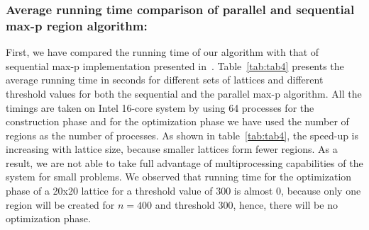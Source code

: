 \documentclass[conference]{IEEEtran}
\begin{document}
\subsubsection*{Average running time comparison of parallel and sequential max-p region algorithm:}
First, we have compared the running time of our algorithm with that of sequential max-p
implementation presented in~\cite{r1}. Table~\ref{tab:tab4} presents the average
running time in seconds for different sets of lattices and different threshold
values for both the sequential and the parallel max-p algorithm. All the timings are taken on Intel 16-core system by using 64 processes for the construction phase and for the optimization phase we have used the number of regions as the number of processes. As shown in table~\ref{tab:tab4}, the speed-up is increasing with lattice size, because smaller lattices form fewer regions. As a result, we are not able to take full advantage of multiprocessing capabilities of the system for small problems. We observed that running time for the optimization phase of a 20x20 lattice for a threshold value of 300 is almost 0, because only one region will be created for $n = 400$ and threshold 300, hence, there will be no optimization phase.
\end{document}

